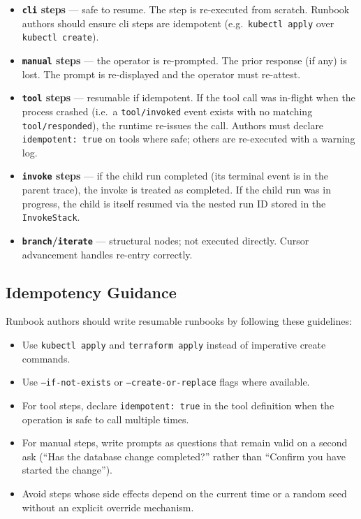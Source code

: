 \begin{itemize}
  \item \textbf{\texttt{cli} steps} — safe to resume. The step is re-executed from scratch. Runbook authors should ensure cli steps are idempotent (e.g.\ \texttt{kubectl apply} over \texttt{kubectl create}).
  \item \textbf{\texttt{manual} steps} — the operator is re-prompted. The prior response (if any) is lost. The prompt is re-displayed and the operator must re-attest.
  \item \textbf{\texttt{tool} steps} — resumable if idempotent. If the tool call was in-flight when the process crashed (i.e.\ a \texttt{tool/invoked} event exists with no matching \texttt{tool/responded}), the runtime re-issues the call. Authors must declare \texttt{idempotent: true} on tools where safe; others are re-executed with a warning log.
  \item \textbf{\texttt{invoke} steps} — if the child run completed (its terminal event is in the parent trace), the invoke is treated as completed. If the child run was in progress, the child is itself resumed via the nested run ID stored in the \texttt{InvokeStack}.
  \item \textbf{\texttt{branch}/\texttt{iterate}} — structural nodes; not executed directly. Cursor advancement handles re-entry correctly.
\end{itemize}

\subsection{Idempotency Guidance}

Runbook authors should write resumable runbooks by following these guidelines:

\begin{itemize}
  \item Use \texttt{kubectl apply} and \texttt{terraform apply} instead of imperative create commands.
  \item Use \texttt{--if-not-exists} or \texttt{--create-or-replace} flags where available.
  \item For tool steps, declare \texttt{idempotent: true} in the tool definition when the operation is safe to call multiple times.
  \item For manual steps, write prompts as questions that remain valid on a second ask (``Has the database change completed?'' rather than ``Confirm you have started the change'').
  \item Avoid steps whose side effects depend on the current time or a random seed without an explicit override mechanism.
\end{itemize}

